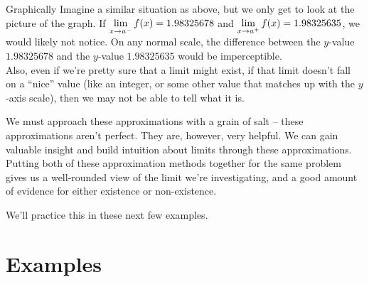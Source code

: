 \begin{defn}{Graphically}
  Imagine a similar situation as above, but we only get to look at the picture of the graph.
  If $\displaystyle \lim_{x\to a^-} f(x) = 1.98325678$ and $\displaystyle \lim_{x\to a^+} f(x) = 1.98325635$, we would likely not notice.
  On any normal scale, the difference between the $y$-value $1.98325678$ and the $y$-value $1.98325635$ would be imperceptible.\\

  Also, even if we're pretty sure that a limit might exist, if that limit doesn't fall on a ``nice'' value (like an integer, or some other value that matches up with the $y$-axis scale), then we may not be able to tell what it is.
\end{defn}

We must approach these approximations with a grain of salt -- these approximations aren't perfect.
They are, however, very helpful.
We can gain valuable insight and build intuition about limits through these approximations.
Putting both of these approximation methods together for the same problem gives us a well-rounded view of the limit we're investigating, and a good amount of evidence for either existence or non-existence.

We'll practice this in these next few examples.

\section*{Examples}


